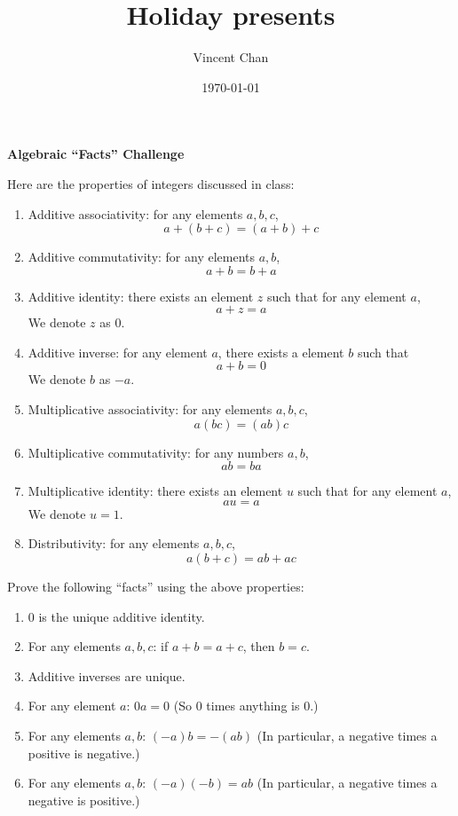 \documentclass{article}
\title{Holiday presents}
\author{Vincent Chan}
\date{\today}
\begin{document}
\begin{center}
\textbf{Algebraic ``Facts'' Challenge}
\end{center}

Here are the properties of integers discussed in class:
\begin{enumerate}
	\item Additive associativity: for any elements $a,b,c$,
	\[
		a+(b+c) = (a+b)+c
	\]
	\item Additive commutativity: for any elements $a,b$,
	\[
		a+b = b+a
	\]
	\item Additive identity: there exists an element $z$ such that for any element $a$,
	\[
		a+z = a
	\]
	We denote $z$ as $0$.
	\item Additive inverse: for any element $a$, there exists a element $b$ such that 
	\[
		a+b = 0
	\]
	We denote $b$ as $-a$.	
	\item Multiplicative associativity: for any elements $a,b,c$,
	\[
		a(bc) = (ab)c
	\]
	\item Multiplicative commutativity: for any numbers $a,b$,
	\[
		ab = ba
	\]
	\item Multiplicative identity: there exists an element $u$ such that for any element $a$,
	\[
		au = a
	\]
	We denote $u = 1$.
	\item Distributivity: for any elements $a,b,c$,
	\[
		a(b+c) = ab+ac
	\]
\end{enumerate}

Prove the following ``facts'' using the above properties:
\begin{enumerate}
\item 0 is the unique additive identity.
\item For any elements $a,b,c$: if $a+b = a+c$, then $b=c$.
\item Additive inverses are unique.
\item For any element $a$: $0a = 0$ (So 0 times anything is 0.)
\item For any elements $a,b$: $(-a)b = -(ab)$ (In particular, a negative times a positive is negative.)
\item For any elements $a,b$: $(-a)(-b) = ab$ (In particular, a negative times a negative is positive.)
\end{enumerate}
\end{document}
